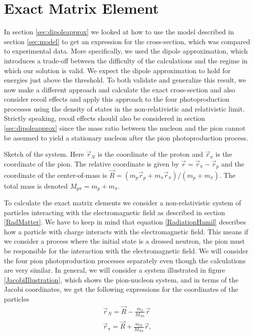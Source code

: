 \section{Exact Matrix Element}\label{sec:exact}
In section \ref{sec:dipoleapprox} we looked at how to use the model described in section \ref{sec:model} to get an expression for the cross-section, which was compared to experimental data. More specifically, we used the dipole approximation, which introduces a trade-off between the difficulty of the calculations and the regime in which our solution is valid. We expect the dipole approximation to hold for energies just above the threshold. To both validate and generalize this result, we now make a different approach and calculate the exact cross-section and also consider recoil effects and apply this approach to the four photoproduction processes using the density of states in the non-relativistic and relativistic limit. Strictly speaking, recoil effects should also be considered in section \ref{sec:dipoleapprox} since the mass ratio between the nucleon and the pion cannot be assumed to yield a stationary nucleon after the pion photoproduction process.  
\begin{marginfigure}
	\centering
	
	\caption{Sketch of the system. Here $\vec{r}_N$ is the coordinate of the proton and $\vec{r}_\pi$ is the coordinate of the pion. The relative coordinate is given by $\vec{r}=\vec{r}_\pi-\vec{r}_p$ and the coordinate of the center-of-mass is $\vec{R}=(m_p \vec{r}_p+m_\pi\vec{r}_\pi)/(m_p+m_\pi)$. The total mass is denoted $M_{p\pi}=m_p+m_\pi$.}
	\label{JacobiIllustration}
\end{marginfigure}
To calculate the exact matrix elements we consider a non-relativistic system of particles interacting with the electromagnetic field as described in section \ref{RadMatter}. We have to keep in mind that equation \eqref{RadiationHamil} describes how a particle with charge interacts with the electromagnetic field. This means if we consider a process where the initial state is a dressed neutron, the pion must be responsible for the interaction with the electromagnetic field. We will consider the four pion photoproduction processes separately even though the calculations are very similar. In general, we will consider a system illustrated in figure \ref{JacobiIllustration}, which shows the pion-nucleon system, and in terms of the Jacobi coordinates, we get the following expressions for the coordinates of the particles
\begin{align} \label{Coordinates}
	\vec{r}_N = \vec{R}-\frac{m_\pi}{M_{N\pi}}\vec{r} \\
	\vec{r}_\pi = \vec{R}+\frac{m_N}{M_{N\pi}}\vec{r},
\end{align}

